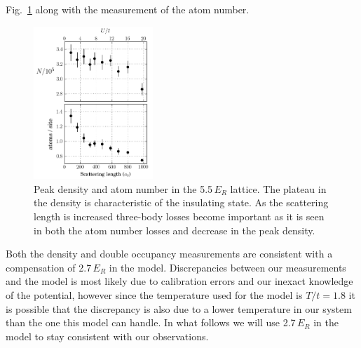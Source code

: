 \documentclass[11pt,letter]{article}
\begin{document}
Fig.~\ref{fig:dens-5.5} along with the measurement of the atom number. 
\begin{figure}
\centering
\includegraphics[width=0.4\textwidth]{figures_140130/insitu_density.png}
\caption[Peak density and atom number]{\small Peak density and atom number in
the 5.5\,$E_{R}$ lattice. The plateau in the density is characteristic of the
insulating state.  As the scattering length is increased three-body losses
become important as it is seen in both the atom number losses and decrease in
the peak density. }
\label{fig:dens-5.5} 
\end{figure}
Both the density and double occupancy measurements are consistent with a
compensation of 2.7\,$E_{R}$ in the model.   Discrepancies between our
measurements and the model is most likely due to calibration errors and our
inexact knowledge of the potential, however since the temperature used for the
model is $T/t = 1.8$ it is possible that the discrepancy is also  due to a
lower temperature in our system  than the one this model can handle.   In what
follows we will use 2.7\,$E_{R}$ in the model to stay  consistent with our
observations.  
\end{document}
